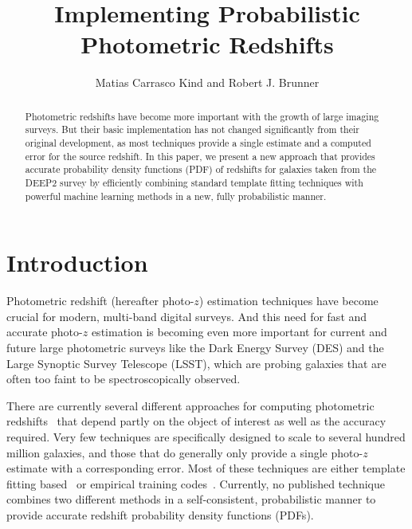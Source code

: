 
\resetcounters





\title{Implementing Probabilistic Photometric Redshifts}
\author{Matias Carrasco Kind and Robert J. Brunner
}


\begin{abstract}
Photometric redshifts have become more important with the growth of large imaging surveys. But their basic implementation has not changed significantly from their original development, as most techniques provide a single estimate and a computed error for the source redshift. In this paper, we present a new approach that provides accurate probability density functions (PDF) of redshifts for galaxies taken from the DEEP2 survey  by efficiently combining standard template fitting techniques with powerful machine learning methods in a new, fully probabilistic manner.
\end{abstract}

\section{Introduction}
Photometric redshift (hereafter photo-$z$) estimation techniques have become crucial for modern, multi-band digital surveys. And this need for fast and accurate photo-$z$ estimation is becoming even more important for current and future large photometric surveys like the Dark Energy Survey (DES) and the Large Synoptic Survey Telescope (LSST), which are probing galaxies that are often too faint to be spectroscopically observed. 

There are currently several different approaches for computing photometric redshifts~\citep[see, \textit{ e.g.},][for an updated comparison of current photometric redshift methods and public codes]{Hildebrandt2010,Abdalla2011} that depend partly on the object of interest as well as the accuracy required. Very few techniques are specifically designed to scale to several hundred million galaxies, and those that do generally only provide a single photo-$z$ estimate with a corresponding error. Most of these techniques are either template fitting based~\citep[\textit{e.g.,}][]{Benitez2000} or empirical training codes~\citep[\textit{e.g.,}][]{Carrasco2013}. Currently, no published technique combines two different methods in a self-consistent, probabilistic manner to provide accurate redshift probability density functions (PDFs).

